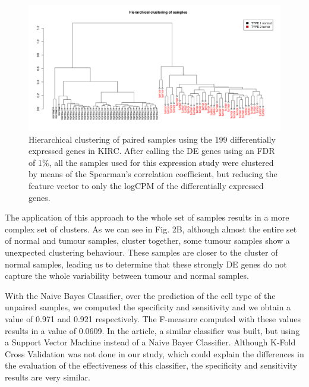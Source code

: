 \documentclass[9pt,twocolumn,twoside]{gsajnl}
\begin{document}
\begin{figure}[htbp]
\centering
\includegraphics[width=\textwidth]{figures/fig2.png}
\caption{Hierarchical clustering of paired samples using the 199 differentially expressed genes in KIRC. After calling the DE genes using an FDR of 1\%, all the samples used for this expression study were clustered by means of the Spearman's correlation coefficient, but reducing the feature vector to only the logCPM of the differentially expressed genes. }%
\label{fig:spectrum}
\end{figure}

The application of this approach to the whole set of samples results in a more complex set of clusters. As we can see in Fig. 2B, although almost the entire set of normal and tumour samples, cluster together, some tumour samples show a unexpected clustering behaviour. These samples are closer to the cluster of normal samples, leading us to determine that these strongly DE genes do not capture the whole variability between tumour and normal samples.

With the Naive Bayes Classifier, over the prediction of the cell type of the unpaired samples, we computed the specificity and sensitivity and we obtain a value of 0.971 and 0.921 respectively. The F-measure computed with these values results in a value of 0.0609. In the \citep{Yang2014} article, a similar classifier was built, but using a Support Vector Machine instead of a Naive Bayer Classifier. Although K-Fold Cross Validation was not done in our study, which could explain the differences in the evaluation of the effectiveness of this classifier, the specificity and sensitivity results are very similar.
\end{document}
